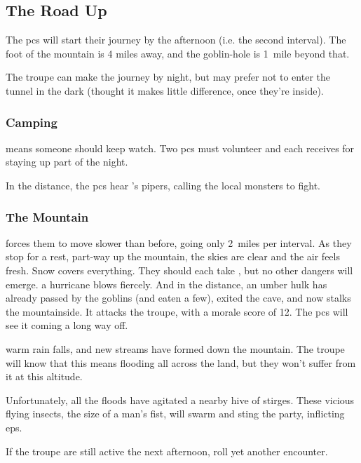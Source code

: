 \begin{multicols}{2}
\subsection{The Road Up}

The \glspl{pc} will start their \gls{journey} by the afternoon (i.e. the second \gls{interval}).
The foot of the mountain is 4 miles away, and the goblin-hole is 1~mile beyond that.

The troupe can make the journey by night, but may prefer not to enter the tunnel in the dark (thought it makes little difference, once they're inside).

\subsubsection{Camping}
means someone should keep watch.
Two \glspl{pc} must volunteer and each receives  for staying up part of the night.

In the distance, the \glspl{pc} hear 's pipers, calling the local \glspl{monster} to fight.

\subsubsection{The Mountain}
forces them to move slower than before, going only 2~miles per \gls{interval}.
As they stop for a rest, part-way up the mountain,
\ifcase\value{temperature}
  the skies are clear and the air feels fresh.
  Snow covers everything.
  They should each take , but no other dangers will emerge.
  \or
  a hurricane blows fiercely.
  And in the distance, an umber hulk has already passed by the goblins (and eaten a few), exited the cave, and now stalks the mountainside.
  It attacks the troupe, with a morale score of 12.
  The \glspl{pc} will see it coming a long way off.

  \umberhulk
  \else
  warm rain falls, and new streams have formed down the mountain.
  The troupe will know that this means flooding all across the land, but they won't suffer from it at this altitude.

  Unfortunately, all the floods have agitated a nearby hive of stirges.
  These vicious flying insects, the size of a man's fist, will swarm%
  and sting the party, inflicting \glspl{ep}.%

  \stirgeSwarm
\fi

If the troupe are still active the next afternoon, roll yet another encounter.%


\end{multicols}
